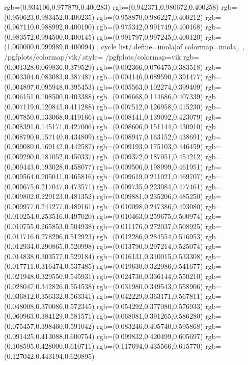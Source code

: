 {{{			rgb=(0.934106,0.977879,0.400283)
			rgb=(0.942371,0.980672,0.400258)
			rgb=(0.950623,0.983452,0.400235)
			rgb=(0.958870,0.986227,0.400212)
			rgb=(0.967110,0.988992,0.400190)
			rgb=(0.975342,0.991749,0.400168)
			rgb=(0.983572,0.994500,0.400145)
			rgb=(0.991797,0.997245,0.400120)
			rgb=(1.000000,0.999989,0.400094)
		},
	cycle list/.define={imola}{[of colormap=imola]},
	},
	/pgfplots/colormap/vik/.style={
		/pgfplots/colormap={vik}{%
			rgb=(0.001328,0.069836,0.379529)
			rgb=(0.002366,0.076475,0.383518)
			rgb=(0.003304,0.083083,0.387487)
			rgb=(0.004146,0.089590,0.391477)
			rgb=(0.004897,0.095948,0.395453)
			rgb=(0.005563,0.102274,0.399409)
			rgb=(0.006151,0.108500,0.403388)
			rgb=(0.006668,0.114686,0.407339)
			rgb=(0.007119,0.120845,0.411288)
			rgb=(0.007512,0.126958,0.415230)
			rgb=(0.007850,0.133068,0.419166)
			rgb=(0.008141,0.139092,0.423079)
			rgb=(0.008391,0.145171,0.427006)
			rgb=(0.008606,0.151144,0.430910)
			rgb=(0.008790,0.157140,0.434809)
			rgb=(0.008947,0.163152,0.438691)
			rgb=(0.009080,0.169142,0.442587)
			rgb=(0.009193,0.175103,0.446459)
			rgb=(0.009290,0.181052,0.450337)
			rgb=(0.009372,0.187051,0.454212)
			rgb=(0.009443,0.193028,0.458077)
			rgb=(0.009506,0.198999,0.461951)
			rgb=(0.009564,0.205011,0.465816)
			rgb=(0.009619,0.211021,0.469707)
			rgb=(0.009675,0.217047,0.473571)
			rgb=(0.009735,0.223084,0.477461)
			rgb=(0.009802,0.229123,0.481352)
			rgb=(0.009881,0.235206,0.485250)
			rgb=(0.009977,0.241277,0.489161)
			rgb=(0.010098,0.247386,0.493080)
			rgb=(0.010254,0.253516,0.497020)
			rgb=(0.010463,0.259675,0.500974)
			rgb=(0.010755,0.265853,0.504938)
			rgb=(0.011176,0.272037,0.508925)
			rgb=(0.011716,0.278296,0.512923)
			rgb=(0.012286,0.284554,0.516953)
			rgb=(0.012934,0.290865,0.520998)
			rgb=(0.013790,0.297214,0.525074)
			rgb=(0.014838,0.303577,0.529184)
			rgb=(0.016131,0.310015,0.533308)
			rgb=(0.017711,0.316474,0.537485)
			rgb=(0.019630,0.322986,0.541677)
			rgb=(0.021948,0.329550,0.545931)
			rgb=(0.024730,0.336144,0.550210)
			rgb=(0.028047,0.342826,0.554538)
			rgb=(0.031980,0.349543,0.558906)
			rgb=(0.036812,0.356332,0.563341)
			rgb=(0.042229,0.363171,0.567811)
			rgb=(0.048008,0.370086,0.572345)
			rgb=(0.054292,0.377080,0.576933)
			rgb=(0.060963,0.384129,0.581571)
			rgb=(0.068081,0.391265,0.586280)
			rgb=(0.075457,0.398460,0.591042)
			rgb=(0.083246,0.405740,0.595868)
			rgb=(0.091425,0.413088,0.600754)
			rgb=(0.099832,0.420499,0.605697)
			rgb=(0.108595,0.428000,0.610711)
			rgb=(0.117694,0.435566,0.615770)
			rgb=(0.127042,0.443194,0.620895)
}}}
